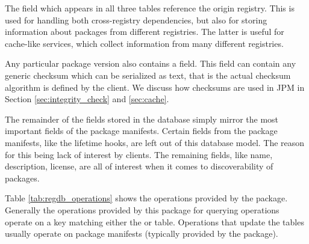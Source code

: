 The  field which appears in all three tables reference the origin
registry. This is used for handling both cross-registry dependencies, but also
for storing information about packages from different registries. The latter is
useful for cache-like services, which collect information from many different
registries.

Any particular package version also contains a  field. This
field can contain any generic checksum which can be serialized as text, that is
the actual checksum algorithm is defined by the client. We discuss how
checksums are used in JPM in Section \ref{sec:integrity_check} and
\ref{sec:cache}.

The remainder of the fields stored in the database simply mirror the most
important fields of the package manifests. Certain fields from the package
manifests, like the lifetime hooks, are left out of this database model. The
reason for this being lack of interest by clients. The remaining fields, like
name, description, license, are all of interest when it comes to
discoverability of packages.

Table \ref{tab:regdb_operations} shows the operations provided by the \regdb
package. Generally the operations provided by this package for querying
operations operate on a key matching either the  or
 table. Operations that update the tables usually
operate on package manifests (typically provided by the 
package).

